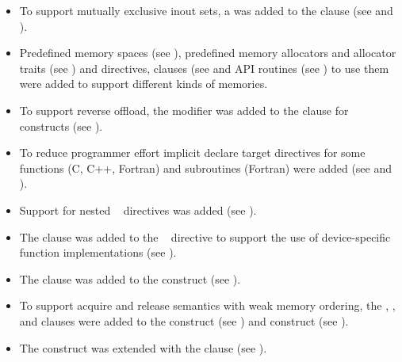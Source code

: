 \begin{itemize}
\item To support mutually exclusive inout sets, a 
       was added to the  clause (see
       and ).

\item Predefined memory spaces (see ), 
      predefined memory allocators and allocator traits (see 
      ) and directives, clauses (see 
       and API routines (see 
      ) to use them were added 
      to support different kinds of memories.

\item To support reverse offload, the  modifier was
      added to the  clause for  constructs (see
      ).

\item To reduce programmer effort implicit declare target directives for
      some functions (C, C++, Fortran) and subroutines (Fortran) were added
      (see  and
      ).

\item Support for nested ~ directives was added
      (see ).

\item The  clause was added to the
      ~ directive to support the use of
      device-specific function implementations (see
      ).

\item The  clause was added to the  construct
      (see ).

\item To support acquire and release semantics with weak memory ordering, the
      , , and  clauses were added to
      the  construct (see ) and
       construct (see ).

\item The  construct was extended with the  clause
      (see ).


\end{itemize}
